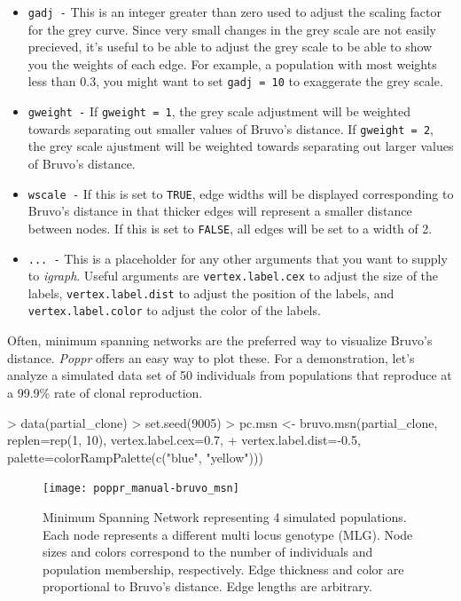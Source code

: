 \documentclass[letterpaper]{article}
\begin{document}
\begin{itemize}
  \item \texttt{gadj -} This is an integer greater than zero used to adjust the scaling factor for the grey curve. Since very small changes in the grey scale are not easily precieved, it's useful to be able to adjust the grey scale to be able to show you the weights of each edge. For example, a population with most weights less than 0.3, you might want to set \texttt{gadj = 10} to exaggerate the grey scale. 
  \item \texttt{gweight -} If \texttt{gweight = 1}, the grey scale adjustment will be weighted towards separating out smaller values of Bruvo's distance. If \texttt{gweight = 2}, the grey scale ajustment will be weighted towards separating out larger values of Bruvo's distance.
  \item \texttt{wscale -} If this is set to \texttt{TRUE}, edge widths will be displayed corresponding to Bruvo's distance in that thicker edges will represent a smaller distance between nodes. If this is set to \texttt{FALSE}, all edges will be set to a width of 2. 
  \item \texttt{... -} This is a placeholder for any other arguments that you want to supply to \textit{igraph}. Useful arguments are \texttt{vertex.label.cex} to adjust the size of the labels, \texttt{vertex.label.dist} to adjust the position of the labels, and \texttt{vertex.label.color} to adjust the color of the labels.
\end{itemize}

Often, minimum spanning networks are the preferred way to visualize Bruvo's distance. \textit{Poppr} offers an easy way to plot these. For a demonstration, let's analyze a simulated data set of 50 individuals from populations that reproduce at a 99.9\% rate of clonal reproduction.

\begin{Schunk}
\begin{Sinput}
> data(partial_clone)
> set.seed(9005)
> pc.msn <- bruvo.msn(partial_clone, replen=rep(1, 10), vertex.label.cex=0.7, 
+           vertex.label.dist=-0.5, palette=colorRampPalette(c("blue", "yellow")))
\end{Sinput}
\end{Schunk}
\begin{figure}[ht!]
  \centering
  \caption{\footnotesize Minimum Spanning Network representing 4 simulated populations. Each node represents a different multi locus genotype (MLG). Node sizes and colors correspond to the number of individuals and population membership, respectively. Edge thickness and color are proportional to Bruvo's distance. Edge lengths are arbitrary.}
  \label{mst_bruvo}
\texttt{[image: poppr\_manual-bruvo\_msn]}
\end{figure}
\end{document}
